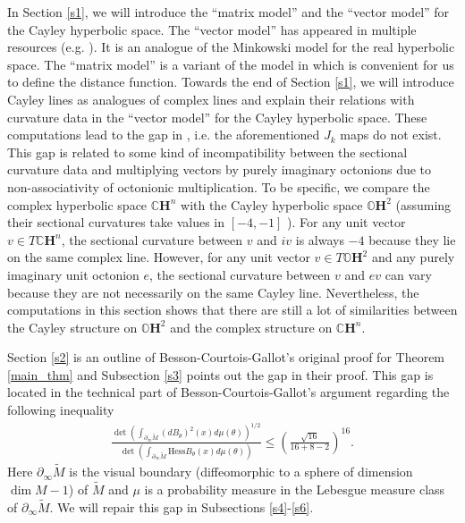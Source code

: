 \documentclass{article}
\newcommand{\CC}{\mathbb{C}}
\newcommand{\OO}{\mathbb{O}}
\newcommand{\RR}{\mathbb{R}}
\newcommand{\del}{\partial}
\newcommand{\hess}{\mathrm{Hess}}
\theoremstyle{definition}
\begin{document}
In Section \ref{s1}, we will introduce the ``matrix model'' and the ``vector model'' for the Cayley hyperbolic space. The ``vector model'' has appeared in multiple resources (e.g. \cite{Parker}). It is an analogue of the Minkowski model for the real hyperbolic space. The ``matrix model'' is a variant of the model in \cite[\S19. Spaces of $\RR$-rank 1]{Mostow73} which is convenient for us to define the distance function. Towards the end of Section \ref{s1}, we will introduce Cayley lines as analogues of complex lines and explain their relations with curvature data in the ``vector model'' for the Cayley hyperbolic space. These computations lead to the gap in \cite[page 751]{BCG1}, i.e. the aforementioned $J_k$ maps do not exist. This gap is related to some kind of incompatibility between the sectional curvature data and multiplying vectors by purely imaginary octonions due to non-associativity of octonionic multiplication. To be specific, we compare the complex hyperbolic space $\CC\mathbf{H}^n$ with the Cayley hyperbolic space $\OO\mathbf{H}^2$ (assuming their sectional curvatures take values in $[-4,-1]$ ). For any unit vector $v\in T\CC\mathbf{H}^n$, the sectional curvature between $v$ and $iv$ is always $-4$ because they lie on the same complex line. However, for any unit vector $v\in T\OO\mathbf{H}^2$ and any purely imaginary unit octonion $e$, the sectional curvature between $v$ and $ev$ can vary because they are not necessarily on the same Cayley line. Nevertheless, the computations in this section shows that there are still a lot of similarities between the Cayley structure on $\OO\mathbf{H}^2$ and the complex structure on $\CC\mathbf{H}^n$. 

Section \ref{s2} is an outline of Besson-Courtois-Gallot's original proof for Theorem \ref{main_thm} and Subsection \ref{s3} points out the gap in their proof. This gap is located in the technical part of Besson-Courtois-Gallot's argument regarding the following inequality
\begin{align*}\frac{\det\left(\int_{\del_\infty\widetilde M}(dB_\theta)^2(x)d\mu(\theta)\right)^{1/2}}{\det\left(\int_{\del_\infty\widetilde M}\hess B_\theta(x)d\mu(\theta)\right)}\leq\left(\frac{\sqrt{16}}{16+8-2}\right)^{16}.\end{align*}
Here $\del_\infty \widetilde M$ is the visual boundary (diffeomorphic to a sphere of dimension $\dim M-1$) of $\widetilde M$ and $\mu$ is a probability measure in the Lebesgue measure class of $\del_\infty \widetilde M$. We will repair this gap in Subsections \ref{s4}-\ref{s6}. 
\end{document}
